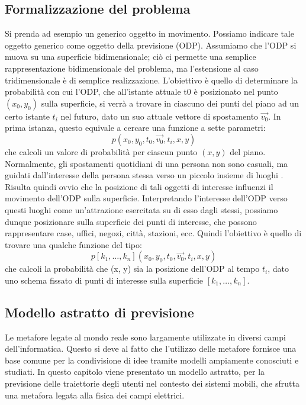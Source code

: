 \subsection{Formalizzazione del problema}
Si prenda ad esempio un generico oggetto in movimento. Possiamo indicare
tale oggetto generico come oggetto della previsione (ODP). Assumiamo che
l'ODP si muova su una superficie bidimensionale; ci\`o ci permette una semplice
rappresentazione bidimensionale del problema, ma l'estensione al caso tridimensionale
\`e di semplice realizzazione. L'obiettivo \`e quello di determinare la
probabilit\`a con cui l'ODP, che all'istante attuale t0 \`e posizionato nel punto
$(x_{0}, y_{0})$ sulla superficie, si verr\`a a trovare in ciascuno dei punti del piano ad
un certo istante $t_{i}$ nel futuro, dato un suo attuale vettore di spostamento
$\vec{v_{0}}$.
In prima istanza, questo equivale a cercare una funzione a sette parametri:
\begin{equation}
p(x_{0},y_{0},t_{0},\vec{v_{0}},t_{i},x,y)
\end{equation}
che calcoli un valore di probabilit\`a per ciascun punto $(x, y)$ del piano.
Normalmente, gli spostamenti quotidiani di una persona non sono casuali, ma
guidati dall'interesse della persona stessa verso un piccolo insieme di luoghi
\cite{cit_44}. Risulta quindi ovvio che la posizione di tali oggetti di interesse
influenzi il movimento dell'ODP sulla superficie. Interpretando l'interesse dell'ODP
verso questi luoghi come un'attrazione esercitata su di esso dagli stessi, possiamo
dunque posizionare sulla superficie dei punti di interesse, che possono rappresentare
case, uffici, negozi, citt\`a, stazioni, ecc. Quindi l'obiettivo \`e quello di
trovare una qualche funzione del tipo:
\begin{equation}
p[k_{1},\dots,k_{n}](x_{0},y_{0},t_{0},\vec{v_{0}},t_{i},x,y)
\end{equation}
che calcoli la probabilit\`a che (x, y) sia la posizione dell'ODP al tempo $t_{i}$,
dato uno schema fissato di punti di interesse sulla superficie $[k_{1},\dots,k_{n}]$.

\subsection{Modello astratto di previsione}
Le metafore legate al mondo reale sono largamente utilizzate in diversi campi
dell'informatica. Questo si deve al fatto che l'utilizzo delle metafore fornisce
una base comune per la condivisione di idee tramite modelli ampiamente
conosciuti e studiati. In questo capitolo viene presentato un modello astratto,
per la previsione delle traiettorie degli utenti nel contesto dei sistemi mobili,
che sfrutta una metafora legata alla fisica dei campi elettrici.

